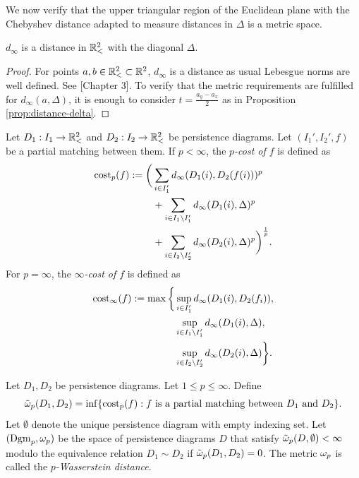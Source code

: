 We now verify that the upper triangular region of the Euclidean plane with the Chebyshev distance adapted to measure distances in $ \Delta $ is a metric space.
\begin{proposition}
    $ d_\infty $ is a distance in $ \mathbb{R}_<^2 $ with the diagonal $ \Delta $.
\end{proposition}
\begin{proof}
    For points $ a, b \in \mathbb{R}_<^2 \subset \mathbb R^2 $, $ d_\infty $ is a distance as usual Lebesgue norms are well defined. See \cite{rudin}[Chapter 3]. To verify that the metric requirements are fulfilled for $ d_\infty(a, \Delta) $, it is enough to consider $ t = \frac{a_y - a_x}{2} $ as in Proposition \ref{prop:distance-delta}.
\end{proof}

\begin{definition}[$p$-cost] \label{def:pcost}
    Let $ D_1: I_1 \to \mathbb{R}_<^2 $ and $ D_2: I_2 \to \mathbb{R}_<^2 $ be persistence diagrams. Let $ (I_1', I_2', f) $ be a partial matching between them. If $ p < \infty $, the {\it $p$-cost of $ f $} is defined as
    \begin{align*}
        \operatorname{cost}_p(f) := \bigg(&\sum_{i \in I_1'} d_\infty(D_1(i), D_2(f(i)))^p \\
        &+ \sum_{i \in I_1 \setminus I_1'} d_\infty(D_1(i), \Delta)^p \\
        &+ \sum_{i \in I_2 \setminus I_2'} d_\infty(D_2(i), \Delta)^p \bigg)^{\frac{1}{p}}.
    \end{align*}
    For $ p = \infty $, the {\it $\infty$-cost of $ f $} is defined as
    \begin{align*}
        \operatorname{cost}_\infty(f) := \max \bigg\{&\sup_{i \in I_1'} d_\infty(D_1(i), D_2(f_i)), \\
        &\sup_{i\in I_1 \setminus I_1'} d_\infty(D_1(i), \Delta), \\
        &\sup_{i\in I_2 \setminus I_2'} d_\infty(D_2(i), \Delta)\bigg\}.
    \end{align*}
\end{definition}

\begin{definition} \label{def:Wasserstein}
    Let $ D_1, D_2 $ be persistence diagrams. Let $ 1 \leq p \leq \infty $. Define
    $$
        \tilde \omega_p (D_1, D_2) = \inf \{\operatorname{cost}_p(f) : f \text{ is a partial matching between } D_1 \text{ and } D_2 \}.
    $$
    Let $ \emptyset $ denote the unique persistence diagram with empty indexing set. Let $ (\operatorname{Dgm}_p, \omega_p) $ be the space of persistence diagrams $ D $ that satisfy $ \tilde \omega_p(D, \emptyset) < \infty $ modulo the equivalence relation $ D_1 \sim D_2 $ if $ \tilde \omega_p (D_1, D_2) = 0 $. The metric $ \omega_p $ is called the {\it $p$-Wasserstein distance}.
\end{definition}

